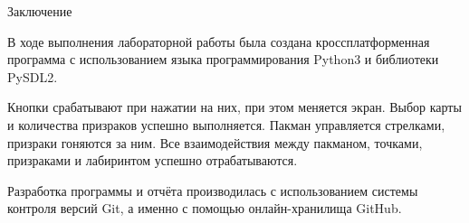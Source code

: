 \documentclass[12pt,a4paper,mathserif]{beamer}
\begin{document}
\begin{frame}{Заключение}
    \begin{block}{}
        В ходе выполнения лабораторной работы была создана кроссплатформенная программа с использованием языка программирования Python3 и библиотеки PySDL2.
    \end{block}

    \begin{block}{}
        Кнопки срабатывают при нажатии на них, при этом меняется экран. Выбор карты и количества призраков успешно выполняется. Пакман управляется стрелками, призраки гоняются за ним. Все взаимодействия между пакманом, точками, призраками и лабиринтом успешно отрабатываются.
    \end{block}

    \begin{block}{}
        Разработка программы и отчёта производилась с использованием системы контроля версий Git, а именно с помощью онлайн-хранилища GitHub.
    \end{block}
\end{frame}
\end{document}
